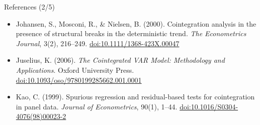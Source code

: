 \begin{frame}{References (2/5)}
\begin{itemize}
    \item Johansen, S., Mosconi, R., \& Nielsen, B. (2000). Cointegration analysis in the presence of structural breaks in the deterministic trend. \textit{The Econometrics Journal}, 3(2), 216--249. \href{https://doi.org/10.1111/1368-423X.00047}{doi:10.1111/1368-423X.00047}
    \item Juselius, K. (2006). \textit{The Cointegrated VAR Model: Methodology and Applications}. Oxford University Press. \href{https://doi.org/10.1093/oso/9780199285662.001.0001}{doi:10.1093/oso/9780199285662.001.0001}
    \item Kao, C. (1999). Spurious regression and residual-based tests for cointegration in panel data. \textit{Journal of Econometrics}, 90(1), 1--44. \href{https://doi.org/10.1016/S0304-4076(98)00023-2}{doi:10.1016/S0304-4076(98)00023-2}
\end{itemize}
\end{frame}

